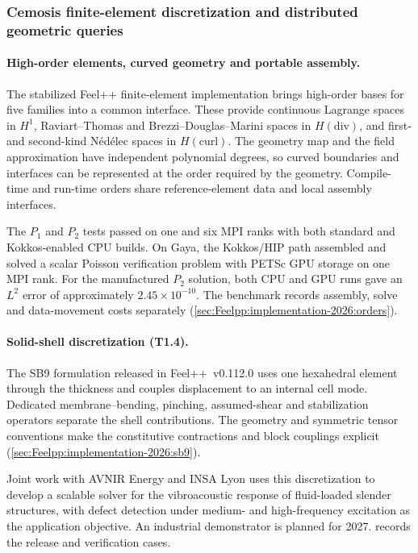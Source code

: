 \subsubsection{Cemosis finite-element discretization and distributed geometric queries}

\paragraph{High-order elements, curved geometry and portable assembly.}
\label{sec:wp1:t1.4:orders}
The stabilized Feel++ finite-element implementation brings high-order
bases for five families into a common interface. These provide continuous
Lagrange spaces in $H^1$, Raviart--Thomas and Brezzi--Douglas--Marini spaces
in $H(\mathrm{div})$, and first- and second-kind N\'ed\'elec spaces in
$H(\mathrm{curl})$.
The geometry map and the field approximation have independent polynomial
degrees, so curved boundaries and interfaces can be represented at the
order required by the geometry. Compile-time and run-time orders share
reference-element data and local assembly interfaces.

The $P_1$ and $P_2$ tests passed on one and six MPI ranks with both standard
and Kokkos-enabled CPU builds. On Gaya, the Kokkos/HIP path assembled and
solved a scalar Poisson verification problem with PETSc GPU storage on
one MPI rank. For the manufactured $P_2$ solution, both CPU and GPU runs
gave an $L^2$ error of approximately $2.45\times10^{-10}$. The benchmark
records assembly, solve and data-movement costs separately
(\cref{sec:Feelpp:implementation-2026:orders}).

\paragraph{Solid-shell discretization (T1.4).}
The SB9 formulation released in Feel++~v0.112.0 uses one hexahedral
element through the thickness and couples displacement to an internal
cell mode. Dedicated membrane--bending, pinching, assumed-shear and
stabilization operators separate the shell contributions. The geometry
and symmetric tensor conventions make the constitutive contractions
and block couplings explicit (\cref{sec:Feelpp:implementation-2026:sb9}).

Joint work with AVNIR Energy and INSA Lyon uses this discretization to
develop a scalable solver for the vibroacoustic response of fluid-loaded
slender structures, with defect detection under medium- and high-frequency
excitation as the application objective. An industrial demonstrator is
planned for 2027.  records the release and
verification cases.

